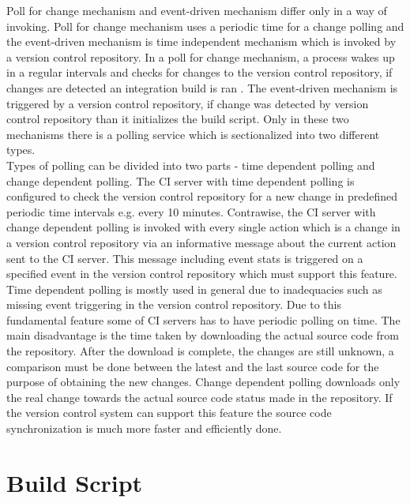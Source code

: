 Poll for change mechanism and event-driven mechanism differ only in a way of invoking. Poll for change mechanism uses a periodic time for a change polling and the event-driven mechanism is time independent mechanism which is invoked by a version control repository. In a poll for change mechanism, a process wakes up in a regular intervals and checks for changes to the version control repository, if changes are detected an integration build is ran \cite{CIbook}. The event-driven mechanism is triggered by a version control repository, if change was detected by version control repository than it initializes the build script. Only in these two mechanisms there is a polling service which is sectionalized into two different types.\\

Types of polling can be divided into two parts - time dependent polling and change dependent polling. The CI server with time dependent polling is configured to check the version control repository for a new change in predefined periodic time intervals e.g. every 10 minutes. Contrawise, the CI server with change dependent polling is invoked with every single action which is a change in a version control repository via an informative message about the current action sent to the CI server. This message including event stats is triggered on a specified event in the version control repository which must support this feature.\\

Time dependent polling is mostly used in general due to inadequacies such as missing event triggering in the version control repository. Due to this fundamental feature some of CI servers has to have  periodic polling on time. The main disadvantage is the time taken by downloading the actual source code from the repository. After the download is complete, the changes are still unknown, a comparison must be done between the latest and the last source code for the purpose of obtaining the new changes. Change dependent polling downloads only the real change towards the actual source code status made in the repository. If the version control system can support this feature the source code synchronization is much more faster and efficiently done.

\section{Build Script}\label{build_script}

